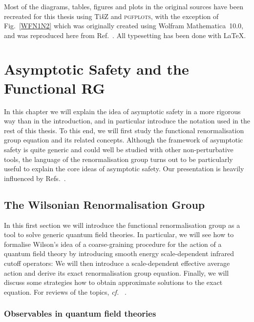 \documentclass[11pt]{book}
\newcommand{\TikZ}{Ti\emph{k}Z }
\newcommand{\pgfplots}{\textsc{pgfplots}}
\newcommand\cf{\textit{cf.}\ }
\numberwithin{equation}{chapter}
\begin{document}
Most of the diagrams, tables, figures and plots in the original
sources have been recreated for this thesis using \TikZ and \pgfplots, with the exception
of Fig.~\ref{WFN1N2} which was originally created using Wolfram Mathematica~10.0,
and was reproduced here from Ref.~\cite{Labus:2015ska}.
All typesetting has been done with \LaTeX.



\mainmatter
\chapter[Asymptotic Safety and the Functional Renormalisation Group]{Asymptotic Safety and the Functional RG}

In this chapter we will explain the idea of asymptotic safety in a
more rigorous way than in the introduction,
and in particular introduce the notation
used in the rest of this thesis.
To this end, we will first study the functional renormalisation group
equation and its related concepts.
Although the framework of asymptotic safety is quite generic
and could well be studied with other non-perturbative tools, the
language of the renormalisation group turns out to be particularly useful
to explain the core ideas of asymptotic safety.
Our presentation is heavily influenced by
Refs.~\cite{Percacci:2011fr, percacci2017introduction}.

\section{The Wilsonian Renormalisation Group}

In this first section we will introduce the functional renormalisation group as
a tool to solve generic quantum field theories. In particular, we will see how to
formalise Wilson's idea of a coarse-graining procedure for the action
of a quantum field theory by introducing smooth energy scale-dependent
infrared cutoff operators: We will then introduce a scale-dependent
effective average action and derive its exact renormalisation group equation.
Finally, we will discuss some strategies how to obtain approximate solutions
to the exact equation. For reviews of the topics, \cf
\cite{
  Berges:2000ew,
  Aoki:2000wm,
  Pawlowski:2005xe,
  Gies:2006wv,
  Rosten:2010vm
}.


\subsection{Observables in quantum field theories}
\end{document}
